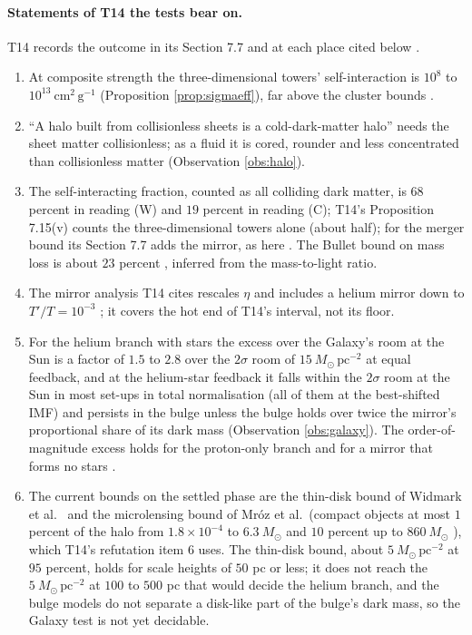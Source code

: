 \documentclass[11pt]{article}
\theoremstyle{definition}
\newcommand{\Msun}{M_{\odot}}
\newcommand{\cmg}{\mathrm{cm^{2}\,g^{-1}}}
\begin{document}
\paragraph{Statements of T14 the tests bear on.} T14 records the outcome in its Section 7.7 and at each place cited below \cite[Fact~7.32]{ButlerT14}.
\begin{enumerate}
\item At composite strength the three-dimensional towers' self-interaction is $10^{8}$ to $10^{13}\ \cmg$ (Proposition \ref{prop:sigmaeff}), far above the cluster bounds \cite[Prop.~6.2]{ButlerT14}.
\item ``A halo built from collisionless sheets is a cold-dark-matter halo'' \cite[Rem.~7.30]{ButlerT14} needs the sheet matter collisionless; as a fluid it is cored, rounder and less concentrated than collisionless matter (Observation \ref{obs:halo}).
\item The self-interacting fraction, counted as all colliding dark matter, is $68$ percent in reading (W) and $19$ percent in reading (C); T14's Proposition 7.15(v) counts the three-dimensional towers alone (about half); for the merger bound its Section 7.7 adds the mirror, as here \cite[Prop.~7.15(v), \S7.7]{ButlerT14}. The Bullet bound on mass loss is about $23$ percent \cite{Randall2008}, inferred from the mass-to-light ratio.
\item The mirror analysis T14 cites \cite[\S 8, refutation item 6]{ButlerT14} rescales $\eta$ and includes a helium mirror down to $T'/T = 10^{-3}$ \cite{RouxCline2020}; it covers the hot end of T14's interval, not its floor.
\item For the helium branch with stars the excess over the Galaxy's room at the Sun is a factor of $1.5$ to $2.8$ over the $2\sigma$ room of $15\ \Msun\,\mathrm{pc^{-2}}$ at equal feedback, and at the helium-star feedback it falls within the $2\sigma$ room at the Sun in most set-ups in total normalisation (all of them at the best-shifted IMF) and persists in the bulge unless the bulge holds over twice the mirror's proportional share of its dark mass (Observation \ref{obs:galaxy}). The order-of-magnitude excess holds for the proton-only branch and for a mirror that forms no stars \cite[\S 8, refutation item 6]{ButlerT14}.
\item The current bounds on the settled phase are the thin-disk bound of Widmark et al.\ \cite{Widmark2021} and the microlensing bound of Mr\'oz et al.\ (compact objects at most $1$ percent of the halo from $1.8 \times 10^{-4}$ to $6.3\ \Msun$ and $10$ percent up to $860\ \Msun$ \cite{Mroz2024}), which T14's refutation item 6 uses. The thin-disk bound, about $5\ \Msun\,\mathrm{pc^{-2}}$ at $95$ percent, holds for scale heights of $50$ pc or less; it does not reach the $5\ \Msun\,\mathrm{pc^{-2}}$ at $100$ to $500$ pc that would decide the helium branch, and the bulge models \cite{Portail2017} do not separate a disk-like part of the bulge's dark mass, so the Galaxy test is not yet decidable.
\end{enumerate}
\end{document}

